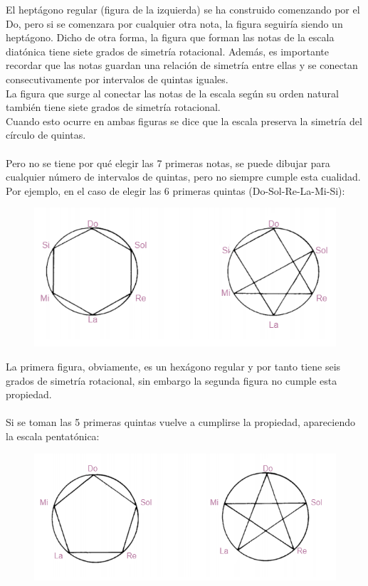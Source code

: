 \documentclass[a4paper, openright, 11pt, titlepage]{report}
\theoremstyle{definition}\newtheorem{defin}[propo]{Definition}
\theoremstyle{definition}\newtheorem{obser}[propo]{Remark}
\theoremstyle{definition}\newtheorem{ejem}[propo]{Ejemplo}
\theoremstyle{definition}\newtheorem{algoritmo}[propo]{Algoritmo}
\begin{document}
El heptágono regular (figura de la izquierda) se ha construido comenzando por el Do, pero si se comenzara por cualquier otra nota, la figura seguiría siendo un heptágono. Dicho de otra forma, la figura que forman las notas de la escala diatónica tiene siete grados de simetría rotacional. Además, es importante recordar que las notas guardan una relación de simetría entre ellas y se conectan consecutivamente por intervalos de quintas iguales.\\
La figura que surge al conectar las notas de la escala según su orden natural también tiene siete grados de simetría rotacional.\\
Cuando esto ocurre en ambas figuras se dice que la escala preserva la simetría del círculo de quintas.\\\\
Pero no se tiene por qué elegir las 7 primeras notas, se puede dibujar para cualquier número de intervalos de quintas, pero no siempre cumple esta cualidad. Por ejemplo, en el caso de elegir las 6 primeras quintas (Do-Sol-Re-La-Mi-Si):
\begin{figure}[H]
    \centering
    \includegraphics[scale = 0.7]{seisQuintas.png}
\end{figure}
La primera figura, obviamente, es un hexágono regular y por tanto tiene seis grados de simetría rotacional, sin embargo la segunda figura no cumple esta propiedad.\\\\
Si se toman las 5 primeras quintas vuelve a cumplirse la propiedad, apareciendo la escala pentatónica:
\begin{figure}[H]
    \centering
    \includegraphics[scale = 0.7]{cincoQuintas.png}
\end{figure}
\end{document}

